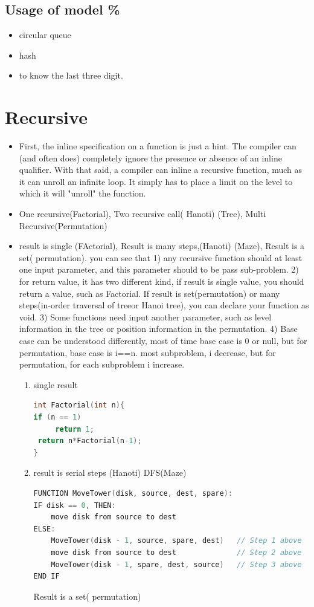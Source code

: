 \documentclass[a4paper,12pt,twoside]{book}
\begin{document}
\subsection{Usage of model \%}

\begin{itemize}
\item circular queue
\item hash
\item to know the last three digit. 
\end{itemize}

\section{Recursive}
\begin{itemize}

\item First, the inline specification on a function is just a hint. The compiler can (and often does) completely ignore the presence or absence of an inline qualifier. With that said, a compiler can inline a recursive function, much as it can unroll an infinite loop. It simply has to place a limit on the level to which it will "unroll" the function.



\item One recursive(Factorial),  Two recursive call( Hanoti) (Tree), Multi Recursive(Permutation)

\item result is single (FActorial), Result is many steps,(Hanoti) (Maze), Result is a set( permutation). you can see that 1) any recursive function should at least one input parameter, and this parameter should to be pass sub-problem. 2) for return value, it has two different kind, if result is single value, you should return a value, such as Factorial. If result is set(permutation) or many steps(in-order traversal of treeor Hanoi tree), you can declare your function as void. 3) Some functions need input another parameter, such as level information in the tree or position information in the permutation. 4) Base case can be understood differently, most of time base case is 0 or null, but for permutation, base case is i==n.  most subproblem, i decrease, but for permutation, for each subproblem i increase. 
\begin{enumerate}
\item single result 
\begin{lstlisting}[frame=single, language=c++]
int Factorial(int n){
if (n == 1) 
     return 1;
 return n*Factorial(n-1);
}
\end{lstlisting}
\item result is serial steps (Hanoti) DFS(Maze)
\begin{lstlisting}[frame=single, language=c++]
FUNCTION MoveTower(disk, source, dest, spare):
IF disk == 0, THEN:
    move disk from source to dest
ELSE:
    MoveTower(disk - 1, source, spare, dest)   // Step 1 above
    move disk from source to dest              // Step 2 above
    MoveTower(disk - 1, spare, dest, source)   // Step 3 above
END IF
\end{lstlisting}
Result is a set( permutation)


\end{enumerate}
\end{itemize}
\end{document}
